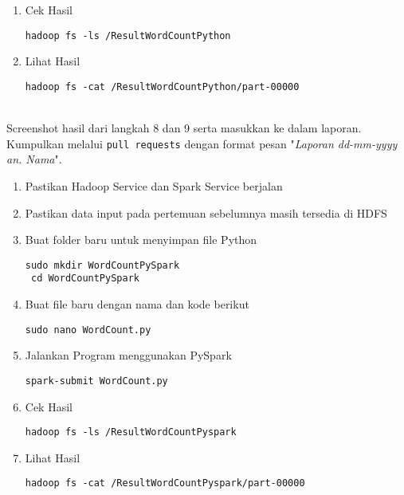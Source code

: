 \documentclass[a4paper]{tufte-handout}
\begin{document}
\begin{enumerate}
\item Cek Hasil
\begin{lstlisting}[language=Terminal]
 hadoop fs -ls /ResultWordCountPython
\end{lstlisting}

\item Lihat Hasil 
\begin{lstlisting}[language=Terminal]
 hadoop fs -cat /ResultWordCountPython/part-00000
\end{lstlisting}

\end{enumerate}

\vspace*{-.5cm}
 \\
Screenshot hasil dari langkah 8 dan 9 serta masukkan ke dalam laporan. Kumpulkan melalui {\tt pull requests} dengan format pesan "\textit{Laporan dd-mm-yyyy an. Nama}".

\hrulefill

\clearpage


\begin{enumerate}
\item Pastikan Hadoop Service dan Spark Service berjalan
\item Pastikan data input pada pertemuan sebelumnya masih tersedia di HDFS
\item Buat folder baru untuk menyimpan file Python
\begin{lstlisting}[language=Terminal]
 sudo mkdir WordCountPySpark
 cd WordCountPySpark
\end{lstlisting}

\item Buat file baru dengan nama dan kode berikut
\begin{lstlisting}[language=Terminal]
 sudo nano WordCount.py
\end{lstlisting} 


\item Jalankan Program menggunakan PySpark
\begin{lstlisting}[language=Terminal]
 spark-submit WordCount.py
\end{lstlisting}

\item Cek Hasil
\begin{lstlisting}[language=Terminal]
 hadoop fs -ls /ResultWordCountPyspark
\end{lstlisting}

\item Lihat Hasil
\begin{lstlisting}[language=Terminal]
 hadoop fs -cat /ResultWordCountPyspark/part-00000
\end{lstlisting} 
\end{enumerate}
\end{document}
